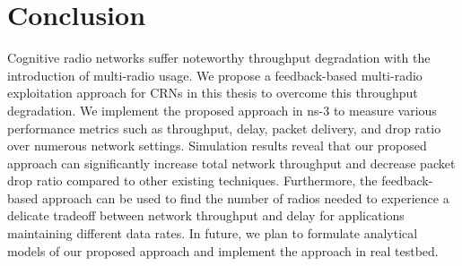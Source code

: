\chapter{Conclusion}
Cognitive radio networks suffer noteworthy throughput degradation with the introduction of multi-radio usage. We propose a feedback-based multi-radio exploitation approach for CRNs in this thesis to overcome this throughput degradation. We implement the proposed approach in ns-3 to measure various performance metrics such as throughput, delay, packet delivery, and drop ratio over numerous network settings. Simulation results reveal that our proposed approach can significantly increase total network throughput and decrease packet drop ratio compared to other existing techniques. Furthermore, the feedback-based approach can be used to find the number of radios needed to experience a delicate tradeoff between network throughput and delay for applications maintaining different data rates. In future, we plan to formulate analytical models of our proposed approach and implement the approach in real testbed.
\endinput
